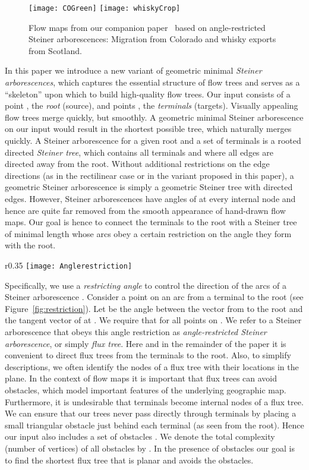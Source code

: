 \documentclass{journalA4}
\begin{document}
\begin{figure}[t]
\centering
\texttt{[image: COGreen]}
\hfill
\texttt{[image: whiskyCrop]}
\caption{Flow maps from our companion paper~\cite{InfoVisFlowMap} based on angle-restricted Steiner arborescences: Migration from Colorado and whisky exports from Scotland.}
\label{fig:flowmaps}
\end{figure}
In this paper we introduce a new variant of geometric minimal \emph{Steiner arborescences}, which captures the essential structure of flow trees and serves as a ``skeleton'' upon which to build high-quality flow trees. Our input consists of a point , the \emph{root} (source), and  points , the \emph{terminals} (targets). Visually appealing flow trees merge quickly, but smoothly. A geometric minimal Steiner arborescence on our input would result in the shortest possible tree, which naturally merges quickly. A Steiner arborescence for a given root and a set of terminals is a rooted directed \emph{Steiner tree}, which contains all terminals and where all edges are directed away from the root. Without additional restrictions on the edge directions (as in the rectilinear case or in the variant proposed in this paper), a geometric Steiner arborescence is simply a geometric Steiner tree with directed edges. However, Steiner arborescences have angles of  at every internal node and hence are quite far removed from the smooth appearance of hand-drawn flow maps. Our goal is hence to connect the terminals to the root with a Steiner tree of minimal length whose arcs obey a certain restriction on the angle they form with the root.

\begin{wrapfigure}[7]{r}{0.35\textwidth}
   \centering
   \texttt{[image: Anglerestriction]}
   \small{\caption{The angle restriction. \label{fig:restriction}}}
\end{wrapfigure}
Specifically, we use a \emph{restricting angle}  to control the direction of the arcs of a Steiner arborescence . Consider a point  on an arc  from a terminal to the root (see Figure~\ref{fig:restriction}). Let  be the angle between the vector from  to the root  and the tangent vector of  at . We require that  for all points  on . We refer to a Steiner arborescence that obeys this angle restriction as \emph{angle-restricted Steiner arborescence}, or simply \emph{flux tree}.
Here and in the remainder of the paper it is convenient to direct flux trees from the terminals to the root. Also, to simplify descriptions, we often identify the nodes of a flux tree  with their locations in the plane.
In the context of flow maps it is important that flux trees can avoid obstacles, which model important features of the underlying geographic map. Furthermore, it is undesirable that terminals become internal nodes of a flux tree. We can ensure that our trees never pass directly through terminals by placing a small triangular obstacle just behind  each terminal (as seen from the root). Hence our input also includes a set of  obstacles . We denote the total complexity (number of vertices) of all obstacles by . In the presence of obstacles our goal is to find the shortest flux tree  that is planar and avoids the obstacles.
\end{document}
